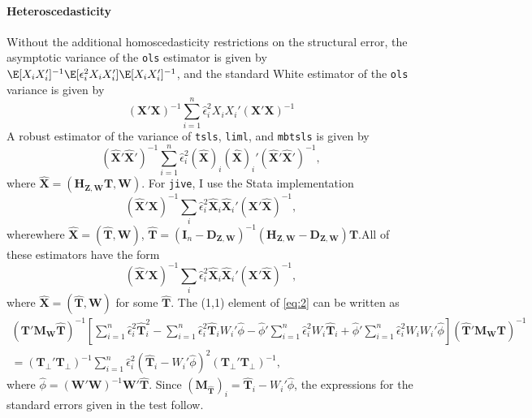 \documentclass{mynotes}
\newcommand{\bx}{\mathbf{X}} %
\newcommand{\bt}{\mathbf{T}} %
\newcommand{\bz}{\mathbf{Z}} %
\newcommand{\bw}{\mathbf{W}} %
\newcommand{\eye}{\mathbf{I}} %
\newcommand{\Hm}[1]{\mathbf{H}_{#1}} %
\newcommand{\Dm}[1]{\mathbf{D}_{#1}} %
\newcommand{\Mm}[1]{\mathbf{M}_{#1}} %
\begin{document}
\begin{appendices}
\paragraph{Heteroscedasticity}
Without the additional homoscedasticity restrictions on the structural error,
the asymptotic variance of the \texttt{ols} estimator is given by
$\E[X_{i}X_{i}']^{-1}\E[\epsilon_{i}^{2}X_{i}X_{i}']\E[X_{i}X_{i}']^{-1}$, and
the standard White estimator of the \texttt{ols} variance is given by
\begin{equation*}
  (\bx'\bx)^{-1}\sum_{i=1}^{n}\hat{\epsilon}_{i}^{2}X_{i}X_{i}'   (\bx'\bx)^{-1}
\end{equation*}
A robust estimator of the variance of
\texttt{tsls}, \texttt{liml}, and \texttt{mbtsls} is given by \citep[Equation
5.34]{wooldridge02}
\begin{equation*}
  (\hat{\bx}'\hat{\bx}')^{-1}
  \sum_{i=1}^{n}\hat{\epsilon}_{i}^{2}(\hat{\bx})_{i}(\hat{\bx})_{i}'
  (\hat{\bx}'\hat{\bx}')^{-1},
\end{equation*}
where $\hat{\bx}=(\Hm{\bz,\bw}\bt,\bw)$. For \texttt{jive}, I use the Stata
implementation \citep{poi06}
\begin{equation*}
  (\hat{\bx}'\bx)^{-1}\sum_{i}\hat{\epsilon}_{i}^{2}\hat{\bx}_{i}\hat{\bx}_{i}'
  (\bx'\hat{\bx})^{-1},
\end{equation*}
wherewhere $\hat{\bx}=(\hat{\bt},\bw)$,
$\hat{\bt}=(\eye_{n}-\Dm{\bz,\bw})^{-1}(\Hm{\bz,\bw}-\Dm{\bz,\bw})\bt$.All of these estimators have the form
\begin{equation}\label{eq:2}
  (\hat{\bx}'\bx)^{-1}\sum_{i}\hat{\epsilon}_{i}^{2}\hat{\bx}_{i}\hat{\bx}_{i}'
  (\bx'\hat{\bx})^{-1},
\end{equation}
where $\hat{\bx}=(\hat{\bt},\bw)$ for some $\hat{\bt}$. The (1,1) element of
\eqref{eq:2} can be written as
\begin{multline*}
  (\bt'\Mm{\bw}\hat{\bt})^{-1}
  \left[\sum_{i=1}^{n}\hat{\epsilon}_{i}^{2}\hat{\bt}_{i}^{2} -
    \sum_{i=1}^{n}\hat{\epsilon}_{i}^{2}\hat{\bt}_{i}W_{i}'\hat{\phi}
    -\hat{\phi}' \sum_{i=1}^{n}\hat{\epsilon}_{i}^{2}W_{i}\hat{\bt}_{i}
    +\hat{\phi}' \sum_{i=1}^{n}\hat{\epsilon}_{i}^{2}W_{i}W_{i}'
    \hat{\phi}\right]  (\hat{\bt}'\Mm{\bw}\bt)^{-1}  \\
  =(\bt_{\perp}'\bt_{\perp})^{-1} \sum_{i=1}^{n}\hat{\epsilon}_{i}^{2}
  \left(\hat{\bt}_{i}-W_{i}'\hat{\phi}\right)^{2}
  (\bt_{\perp}'\bt_{\perp})^{-1},
\end{multline*}
where $\hat{\phi}=(\bw'\bw)^{-1}\bw'\hat{\bt}$. Since
$(\Mm{\hat{\bt}})_{i}=\hat{\bt}_{i}-W_{i}'\hat{\phi}$, the expressions for the
standard errors given in the test follow. 
\end{appendices}
\end{document}
